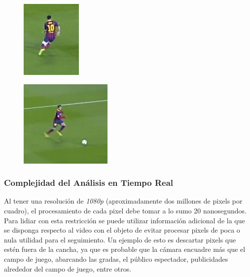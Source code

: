 \documentclass[a4paper,10pt]{article}
\begin{document}
\begin{figure}
    \begin{minipage}{.5\textwidth}
        \centering
        \includegraphics[width=.4\linewidth]{./images/ScreenShot2014-06-11at8-15-38PM.png}
        \label{fig:barsa3}
    \end{minipage}%
    \begin{minipage}{.5\textwidth}
        \centering
        \includegraphics[width=.4\linewidth]{./images/ScreenShot2014-06-11at8-15-52PM.png}
        \label{fig:barsa4}
    \end{minipage}
\end{figure}

\subsubsection{Complejidad del Análisis en Tiempo Real}

Al tener una resolución de \textit{1080p} (aproximadamente dos millones de
pixels por cuadro), el procesamiento de cada pixel debe tomar a lo sumo 20
nanosegundos.  Para lidiar con esta restricción se puede utilizar información
adicional de la que se disponga respecto al video con el objeto de evitar
procesar pixels de poca o nula utilidad para el seguimiento. Un ejemplo de esto
es descartar pixels que estén fuera de la cancha, ya que es probable que la
cámara encuadre más que el campo de juego, abarcando las gradas, el público
espectador, publicidades alrededor del campo de juego, entre otros.
\end{document}
